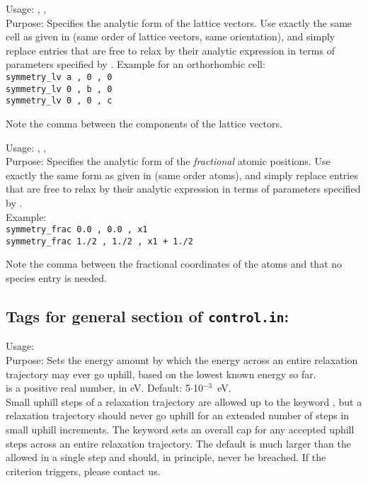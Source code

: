 {
  \noindent
  Usage:  ,  , \\[1.0ex]
  Purpose: Specifies the analytic form of the lattice vectors. Use exactly the same cell as given in
    (same order of lattice vectors, same orientation), and simply replace entries
   that are free to relax by their analytic expression in terms of parameters specified by .
   Example for an orthorhombic cell:\\
   \texttt{symmetry\_lv  a , 0 , 0}\\
   \texttt{symmetry\_lv  0 , b , 0}\\
   \texttt{symmetry\_lv  0 , 0 , c}
}

Note the comma between the components of the lattice vectors.

{
  \noindent
  Usage:  ,  , \\[1.0ex]
  Purpose: Specifies the analytic form of the {\em fractional} atomic positions. Use exactly the same form as given in
    (same order atoms), and simply replace entries  that are free to relax 
   by their analytic expression in terms of parameters specified by .\\
   Example:\\
   \texttt{symmetry\_frac   0.0    ,   0.0   ,  x1}\\
   \texttt{symmetry\_frac  1./2 , 1./2 , x1 + 1./2}
}

Note the comma between the fractional coordinates of the atoms and that no species entry is needed.

\newpage

\subsection*{Tags for general section of \texttt{control.in}:}

{
  \noindent
  Usage:   \\[1.0ex]
  Purpose: Sets the energy amount by which the energy across an entire
  relaxation trajectory may ever go uphill, based on the lowest known energy so far. \\[1.0ex]
   is a positive real number, in eV. Default:
    5$\cdot$10$^{-3}$~eV. \\
}
Small uphill steps of a relaxation trajectory are allowed up to the keyword
, but a relaxation trajectory should never go uphill
for an extended number of steps in small uphill increments. The keyword
 sets an overall cap for any accepted 
uphill steps across an entire relaxation trajectory. The default is much larger
than the allowed  in a single step and should, in
principle, never be breached. If the
 criterion triggers, please
contact us.  

